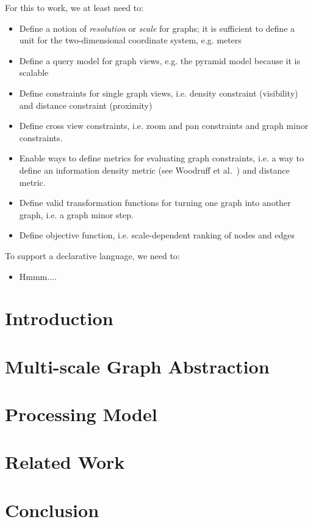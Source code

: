 For this to work, we at least need to:
\begin{itemize}
\item Define a notion of \emph{resolution} or \emph{scale} for graphs; it is sufficient to define a unit for the two-dimensional coordinate system, e.g. meters
\item Define a query model for graph views, e.g. the pyramid model because it is scalable
\item Define constraints for single graph views, i.e. density constraint (visibility) and distance constraint (proximity)
\item Define cross view constraints, i.e. zoom and pan constraints and graph minor constraints.
\item Enable ways to define metrics for evaluating graph constraints, i.e. a way to define an information density metric (see Woodruff et al.~\cite{woodruff1998constant}) and distance metric.
\item Define valid transformation functions for turning one graph into another graph, i.e. a graph minor step.
\item Define objective function, i.e. scale-dependent ranking of nodes and edges
\end{itemize}

To support a declarative language, we need to:

\begin{itemize}
\item Hmmm....
\end{itemize}


\section{Introduction}

\section{Multi-scale Graph Abstraction}

\section{Processing Model}



\section{Related Work}

\section{Conclusion}